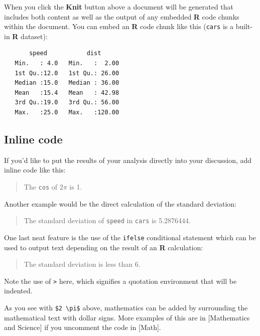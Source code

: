 \documentclass[12pt,twoside]{reedthesis}
\begin{document}
  When you click the \textbf{Knit} button above a document will be
  generated that includes both content as well as the output of any
  embedded \textbf{R} code chunks within the document. You can embed an
  \textbf{R} code chunk like this (\texttt{cars} is a built-in \textbf{R}
  dataset):
  
  \begin{Shaded}
  \begin{Highlighting}[]
  \end{Highlighting}
  \end{Shaded}
  
  \begin{verbatim}
       speed           dist       
   Min.   : 4.0   Min.   :  2.00  
   1st Qu.:12.0   1st Qu.: 26.00  
   Median :15.0   Median : 36.00  
   Mean   :15.4   Mean   : 42.98  
   3rd Qu.:19.0   3rd Qu.: 56.00  
   Max.   :25.0   Max.   :120.00  
  \end{verbatim}
  
  \subsection{Inline code}\label{inline-code}
  
  If you'd like to put the results of your analysis directly into your
  discussion, add inline code like this:
  
  \begin{quote}
  The \texttt{cos} of \(2 \pi\) is 1.
  \end{quote}
  
  Another example would be the direct calculation of the standard
  deviation:
  
  \begin{quote}
  The standard deviation of \texttt{speed} in \texttt{cars} is 5.2876444.
  \end{quote}
  
  One last neat feature is the use of the \texttt{ifelse} conditional
  statement which can be used to output text depending on the result of an
  \textbf{R} calculation:
  
  \begin{quote}
  The standard deviation is less than 6.
  \end{quote}
  
  Note the use of \texttt{\textgreater{}} here, which signifies a
  quotation environment that will be indented.
  
  As you see with \texttt{\$2\ \textbackslash{}pi\$} above, mathematics
  can be added by surrounding the mathematical text with dollar signs.
  More examples of this are in {[}Mathematics and Science{]} if you
  uncomment the code in {[}Math{]}.
  
\end{document}
